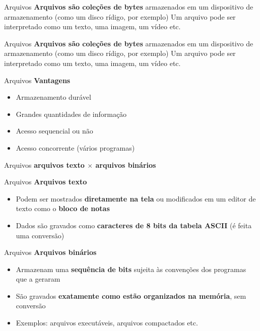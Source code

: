 \documentclass[10pt]{beamer}
\subtitle{Aula 6}
\date{22 de janeiro de 2020}
\begin{document}
\maketitle

\begin{frame}{Arquivos}
  \LARGE
  \textbf{Arquivos são coleções de bytes} armazenados em um dispositivo de armazenamento (como um disco rídigo, por exemplo)
  \vfill
  Um arquivo pode ser interpretado como um texto, uma imagem, um vídeo etc.
\end{frame}

\begin{frame}{Arquivos}
  \LARGE
  \textbf{Arquivos são coleções de bytes} armazenados em um dispositivo de armazenamento (como um disco rídigo, por exemplo)
  \vfill
  Um arquivo pode ser interpretado como um texto, uma imagem, um vídeo etc.
\end{frame}

\begin{frame}{Arquivos}
  \huge
  \textbf{Vantagens}
  \vfill
  \Large
  \begin{itemize}
    \item Armazenamento durável
    \item Grandes quantidades de informação
    \item Acesso sequencial ou não
    \item Acesso concorrente (vários programas)
  \end{itemize}
\end{frame}

\begin{frame}{Arquivos}
  \LARGE
  \centering
  \textbf{arquivos texto $\times$ arquivos binários}
\end{frame}

\begin{frame}{Arquivos}
  \huge
  \textbf{Arquivos texto}
  \vfill
  \Large
  \begin{itemize}
    \item Podem ser mostrados \textbf{diretamente na tela} ou modificados em um editor de texto como o \textbf{bloco de notas}
    \item Dados são gravados como \textbf{caracteres de 8 bits da tabela ASCII} (é feita uma conversão)
  \end{itemize}
\end{frame}

\begin{frame}{Arquivos}
  \huge
  \textbf{Arquivos binários}
  \vfill
  \Large
  \begin{itemize}
    \item Armazenam uma \textbf{sequência de bits} sujeita às convenções dos programas que a geraram
    \item São gravados \textbf{exatamente como estão organizados na memória}, sem conversão
    \item Exemplos: arquivos executáveis, arquivos compactados etc.
  \end{itemize}
\end{frame}
\end{document}
